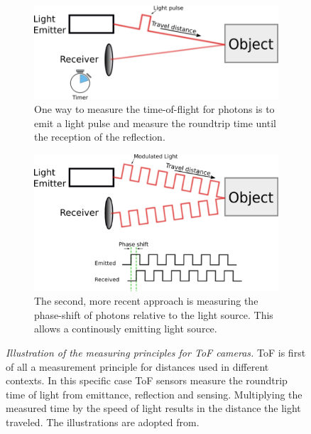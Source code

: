 \begin{figure}[H]
    \centering
    \begin{subfigure}[t]{0.45\textwidth}
        \includegraphics[width=\textwidth]{chapter03/img/tof_traveltime_original.png}
        \caption{One way to measure the time-of-flight for photons is to emit a light pulse and measure the roundtrip time until the reception of the reflection.}\label{fig:tof_roundtrip}
    \end{subfigure}\quad
    \begin{subfigure}[t]{0.45\textwidth}
        \includegraphics[width=\textwidth]{chapter03/img/tof_phase_shift_original.png}
        \caption{The second, more recent approach is measuring the phase-shift of photons relative to the light source. This allows a continously emitting light source.}\label{fig:tof_phase_shift}
    \end{subfigure}
    \caption[Illustration of the measuring principles for \acrshort{ToF} cameras]{\emph{Illustration of the measuring principles for \acrshort{ToF} cameras.} \acrlong{ToF} is first of all a measurement principle for distances used in different contexts. In this specific case \acrshort{ToF} sensors measure the roundtrip time of light from emittance, reflection and sensing. Multiplying the measured time by the speed of light results in the distance the light traveled. The illustrations are adopted from\cite{tof_cameras}.}\label{fig:tof_illustration}
\end{figure}

